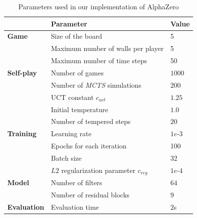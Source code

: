 \documentclass[journal, a4paper]{IEEEtran}
\begin{document}
    \begin{table}[h]
        \centering
        \begin{tabular}{lll}
            \toprule
            & Parameter & Value \\
            \midrule
            \textbf{Game} & Size of the board & 5 \\
            & Maximum number of walls per player & 5 \\
            & Maximum number of time steps & 50 \\
            \midrule
            \textbf{Self-play} & Number of games & $1000$ \\
            & Number of \textit{MCTS} simulations & $200$ \\
            & UCT constant $c_{uct}$ & $1.25$ \\
            & Initial temperature & $1.0$ \\
            & Number of tempered steps & $20$ \\
            \midrule
            \textbf{Training} & Learning rate & $1e$-$3$\\
            & Epochs for each iteration & 100 \\
            &Batch size & 32 \\
            &$L2$ regularization parameter $c_{reg}$ & $1e$-$4$ \\
            \midrule
            \textbf{Model} & Number of filters & $64$\\
            & Number of residual blocks & $9$ \\
            \midrule
            \textbf{Evaluation} & Evaluation time & $2$s \\
            \bottomrule
        \end{tabular}
    \caption{Parameters used in our implementation of AlphaZero}
    \label{tab:alphazero-params}
    \end{table}
\end{document}
